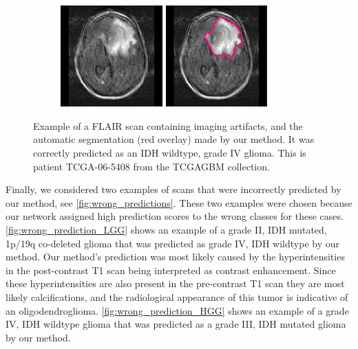 \begin{figure}[htbp]
    \centering
    \begin{subfigure}[b]{\textwidth}
        \centering
        \hfill
        \includegraphics[width=0.43\textwidth, clip, trim=2.5cm 0cm 2.5cm 0cm]{Figures/TCGA-06-5408_FLAIR.png}
        \hfill
        \includegraphics[width=0.43\textwidth, clip, trim=2.5cm 0cm 2.5cm 0cm]{Figures/TCGA-06-5408_FLAIR_MASK.png}
        \hfill
    \end{subfigure}
    \caption{Example of a \acrshort{FLAIR} scan containing imaging artifacts, and the automatic segmentation (red overlay) made by our method.
    It was correctly predicted as an IDH wildtype, grade IV glioma. This is patient TCGA-06-5408 from the \acrshort{TCGAGBM} collection.}\label{fig:low_quality}
\end{figure}

Finally, we considered two examples of scans that were incorrectly predicted by our method, see \cref{fig:wrong_predictions}.
These two examples were chosen because our network assigned high prediction scores to the wrong classes for these cases.
\cref{fig:wrong_prediction_LGG} shows an example of a  grade II, \gls{IDH} mutated, 1p/19q co-deleted glioma that was predicted as grade IV, \gls{IDH} wildtype by our method.
Our method's prediction was most likely caused by the hyperintensities in the post-contrast \gls{T1} scan being interpreted as contrast enhancement.
Since these hyperintensities are also present in the pre-contrast \gls{T1} scan they are most likely calcifications, and the radiological appearance of this tumor is indicative of an oligodendroglioma.
\cref{fig:wrong_prediction_HGG} shows an example of a grade IV, \gls{IDH} wildtype glioma that was predicted as a grade III, \gls{IDH} mutated glioma by our method.

